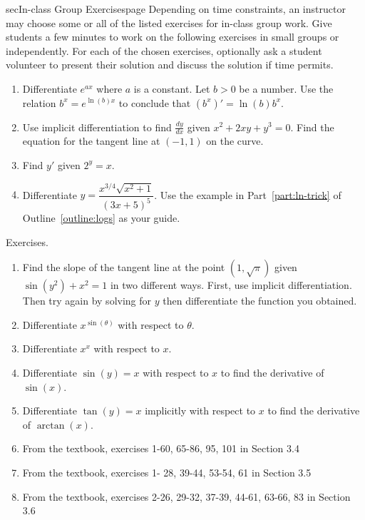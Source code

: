 \documentclass[../main]{subfiles}
\begin{document}
\begin{outline}{sec}{In-class Group Exercises}{page}\label{outline:worksheet}
  Depending on time constraints, an instructor may choose some or all of the listed exercises for in-class group work. Give students a few minutes to work on the following exercises in small groups or independently. For each of the chosen exercises, optionally ask a student volunteer to present their solution and discuss the solution if time permits. 
  \begin{enumerate}
    \item Differentiate \(e^{ax}\) where \(a\) is a constant. Let \(b > 0\) be a number. Use the relation \(b^{x} = e^{\ln(b)x}\) to conclude that \((b^{x})' = \ln(b) b^{x}\).
    \item Use implicit differentiation to find \(\frac{dy}{dx}\) given \(x^{2} + 2xy + y^{3} = 0\).  Find the equation for the tangent line at \((-1,1)\) on the curve.
    \item Find \(y'\) given \(2^{y} = x\).
    \item Differentiate \(y = \dfrac{x^{3/4}\sqrt{x^{2} + 1}}{(3x + 5)^{5}}\).  Use the example in Part~\ref{part:ln-trick} of Outline~\ref{outline:logs} as your guide.
  \end{enumerate}
\end{outline}



%
%
Exercises.
\begin{enumerate}
\item Find the slope of the tangent line at the point \((1,\sqrt{\pi})\) given \(\sin(y^{2}) + x^{2} = 1\) in two different ways. First, use implicit differentiation.  Then try again by solving for \(y\) then differentiate the function you obtained.
\item Differentiate \(x^{\sin(\theta)}\) with respect to \(\theta\).
\item Differentiate \(x^{x}\) with respect to \(x\).
\item Differentiate \(\sin(y) = x\) with respect to \(x\) to find the derivative of \(\sin(x)\).
\item Differentiate \(\tan(y) = x\) implicitly with respect to \(x\) to find the derivative of \(\arctan(x)\). %
\item From the textbook, exercises 1-60, 65-86, 95, 101 in Section 3.4
\item From the textbook, exercises 1- 28, 39-44, 53-54, 61 in Section 3.5
\item From the textbook, exercises 2-26, 29-32, 37-39, 44-61, 63-66, 83  in Section 3.6
\end{enumerate}
\end{document}

